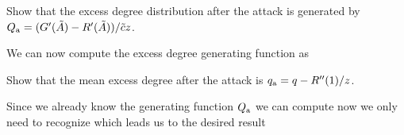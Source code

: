 \subquestion Show that the excess degree distribution after the attack is generated by $Q_{\rm a}=(G'(\tilde{A})-R'(\tilde{A}))/\tilde{c}z$.

\solution
We can now compute the excess degree generating function as 

\subquestion Show that the mean excess degree after the attack is
$q_{\rm a}=q-R''(1)/z$.

\solution 
Since we already know the generating function $Q_{\rm a}$ we can compute 
now we only need to recognize
which leads us to the desired result
